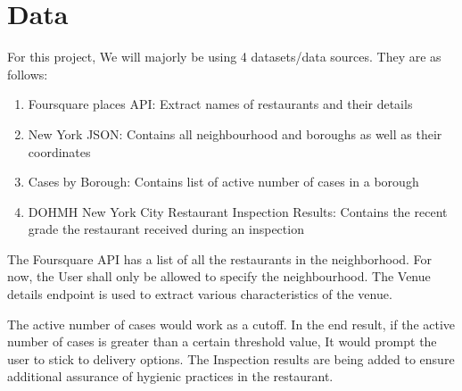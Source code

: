 \documentclass[11pt]{article}
\begin{document}
\section{Data}
\par For this project, We will majorly be using 4 datasets/data sources. They are as follows:
\begin{enumerate}
    \item Foursquare places API: Extract names of restaurants and their details
    \item New York JSON: Contains all neighbourhood and boroughs as well as their coordinates
    \item Cases by Borough: Contains list of active number of cases in a borough
    \item DOHMH New York City Restaurant Inspection Results: Contains the recent grade the restaurant received during an inspection
\end{enumerate}
\par The Foursquare API has a list of all the restaurants in the neighborhood. For now, the User shall only be allowed to specify the neighbourhood. The Venue details endpoint is used to extract various characteristics of the venue. 
\par The active number of cases would work as a cutoff. In the end result, if the active number of cases is greater than a certain threshold value, It would prompt the user to stick to delivery options. The Inspection results are being added to ensure additional assurance of hygienic practices in the restaurant. 
\printbibliography
\end{document}
